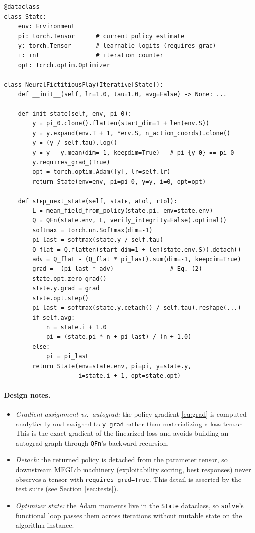 \documentclass[11pt,a4paper]{article}
\begin{document}
\begin{lstlisting}[style=py, caption={mfglib/alg/neural\_fictitious\_play.py (core methods, abridged)}]
@dataclass
class State:
    env: Environment
    pi: torch.Tensor      # current policy estimate
    y: torch.Tensor       # learnable logits (requires_grad)
    i: int                # iteration counter
    opt: torch.optim.Optimizer

class NeuralFictitiousPlay(Iterative[State]):
    def __init__(self, lr=1.0, tau=1.0, avg=False) -> None: ...

    def init_state(self, env, pi_0):
        y = pi_0.clone().flatten(start_dim=1 + len(env.S))
        y = y.expand(env.T + 1, *env.S, n_action_coords).clone()
        y = (y / self.tau).log()
        y = y - y.mean(dim=-1, keepdim=True)   # pi_{y_0} == pi_0
        y.requires_grad_(True)
        opt = torch.optim.Adam([y], lr=self.lr)
        return State(env=env, pi=pi_0, y=y, i=0, opt=opt)

    def step_next_state(self, state, atol, rtol):
        L = mean_field_from_policy(state.pi, env=state.env)
        Q = QFn(state.env, L, verify_integrity=False).optimal()
        softmax = torch.nn.Softmax(dim=-1)
        pi_last = softmax(state.y / self.tau)
        Q_flat = Q.flatten(start_dim=1 + len(state.env.S)).detach()
        adv = Q_flat - (Q_flat * pi_last).sum(dim=-1, keepdim=True)
        grad = -(pi_last * adv)                # Eq. (2)
        state.opt.zero_grad()
        state.y.grad = grad
        state.opt.step()
        pi_last = softmax(state.y.detach() / self.tau).reshape(...)
        if self.avg:
            n = state.i + 1.0
            pi = (state.pi * n + pi_last) / (n + 1.0)
        else:
            pi = pi_last
        return State(env=state.env, pi=pi, y=state.y,
                     i=state.i + 1, opt=state.opt)
\end{lstlisting}

\paragraph{Design notes.}
\begin{itemize}
  \item \emph{Gradient assignment vs.\ autograd:} the policy-gradient
        \eqref{eq:grad} is computed analytically and assigned to
        \texttt{y.grad} rather than materializing a loss tensor. This is the
        exact gradient of the linearized loss and avoids building an autograd
        graph through \texttt{QFn}'s backward recursion.
  \item \emph{Detach:} the returned policy is detached from the parameter
        tensor, so downstream MFGLib machinery (exploitability scoring, best
        responses) never observes a tensor with \texttt{requires\_grad=True}.
        This detail is asserted by the test suite (see Section~\ref{sec:tests}).
  \item \emph{Optimizer state:} the Adam moments live in the \texttt{State}
        dataclass, so \texttt{solve}'s functional loop passes them across
        iterations without mutable state on the algorithm instance.
\end{itemize}
\end{document}
